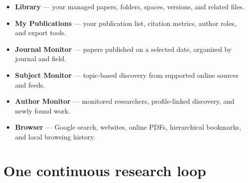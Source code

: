\documentclass[10pt,letterpaper,oneside]{scrreprt}
\providecommand{\tightlist}{\setlength{\itemsep}{1pt}\setlength{\parskip}{0pt}}
\begin{document}
\begin{itemize}
\tightlist
\item
  \textbf{Library} --- your managed papers, folders, spaces, versions, and related files.
\item
  \textbf{My Publications} --- your publication list, citation metrics, author roles, and export tools.
\item
  \textbf{Journal Monitor} --- papers published on a selected date, organized by journal and field.
\item
  \textbf{Subject Monitor} --- topic-based discovery from supported online sources and feeds.
\item
  \textbf{Author Monitor} --- monitored researchers, profile-linked discovery, and newly found work.
\item
  \textbf{Browser} --- Google search, websites, online PDFs, hierarchical bookmarks, and local browsing history.
\end{itemize}

\section{One continuous research loop}\label{one-continuous-research-loop}
\end{document}
